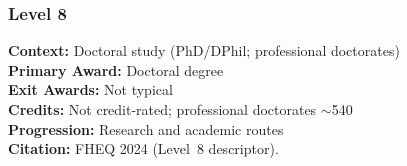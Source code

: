\subsubsection*{Level 8}

\begin{tcolorbox}
\textbf{Context:} Doctoral study (PhD/DPhil; professional doctorates) \\
\textbf{Primary Award:} Doctoral degree \\
\textbf{Exit Awards:} Not typical \\
\textbf{Credits:} Not credit-rated; professional doctorates $\sim$540 \\
\textbf{Progression:} Research and academic routes \\
\textbf{Citation:} FHEQ 2024 (Level~8 descriptor).
\end{tcolorbox}

